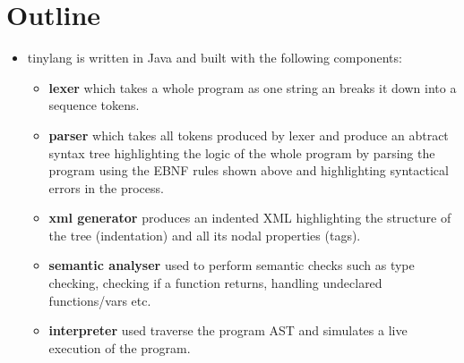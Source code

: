 \section{Outline}
\begin{itemize}
    \item tinylang is written in Java and built with the following components:
    \begin{itemize}
    \item \textbf{lexer} which takes a whole program as one string an breaks it down into a sequence tokens.
    \item \textbf{parser} which takes all tokens produced by lexer and produce an abtract syntax tree highlighting the logic of the whole program by parsing the program using the EBNF rules shown above and highlighting syntactical errors in the process.
    \item \textbf{xml generator} produces an indented XML highlighting the structure of the tree (indentation) and all its nodal properties (tags).
    \item \textbf{semantic analyser} used to perform semantic checks such as type checking, checking if a function returns, handling undeclared functions/vars etc.
    \item  \textbf{interpreter } used traverse the program AST and simulates a live execution of the program.
    \end{itemize}
\end{itemize}